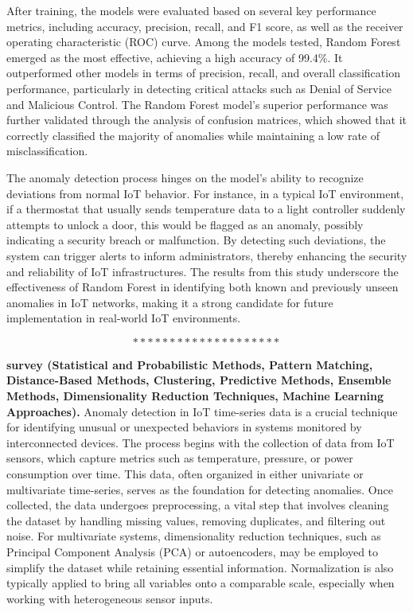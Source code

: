 After training, the models were evaluated based on several key performance metrics, including accuracy, precision, recall, and F1 score, as well as the receiver operating characteristic (ROC) curve. Among the models tested, Random Forest emerged as the most effective, achieving a high accuracy of 99.4\%. It outperformed other models in terms of precision, recall, and overall classification performance, particularly in detecting critical attacks such as Denial of Service and Malicious Control. The Random Forest model's superior performance was further validated through the analysis of confusion matrices, which showed that it correctly classified the majority of anomalies while maintaining a low rate of misclassification.

The anomaly detection process hinges on the model's ability to recognize deviations from normal IoT behavior. For instance, in a typical IoT environment, if a thermostat that usually sends temperature data to a light controller suddenly attempts to unlock a door, this would be flagged as an anomaly, possibly indicating a security breach or malfunction. By detecting such deviations, the system can trigger alerts to inform administrators, thereby enhancing the security and reliability of IoT infrastructures. The results from this study underscore the effectiveness of Random Forest in identifying both known and previously unseen anomalies in IoT networks, making it a strong candidate for future implementation in real-world IoT environments\cite{76}.

$$********************$$

\textbf{survey (Statistical and Probabilistic Methods, Pattern Matching, Distance-Based Methods, Clustering, Predictive Methods, Ensemble Methods, Dimensionality Reduction Techniques, Machine Learning Approaches).} Anomaly detection in IoT time-series data is a crucial technique for identifying unusual or unexpected behaviors in systems monitored by interconnected devices. The process begins with the collection of data from IoT sensors, which capture metrics such as temperature, pressure, or power consumption over time. This data, often organized in either univariate or multivariate time-series, serves as the foundation for detecting anomalies. Once collected, the data undergoes preprocessing, a vital step that involves cleaning the dataset by handling missing values, removing duplicates, and filtering out noise. For multivariate systems, dimensionality reduction techniques, such as Principal Component Analysis (PCA) or autoencoders, may be employed to simplify the dataset while retaining essential information. Normalization is also typically applied to bring all variables onto a comparable scale, especially when working with heterogeneous sensor inputs.

